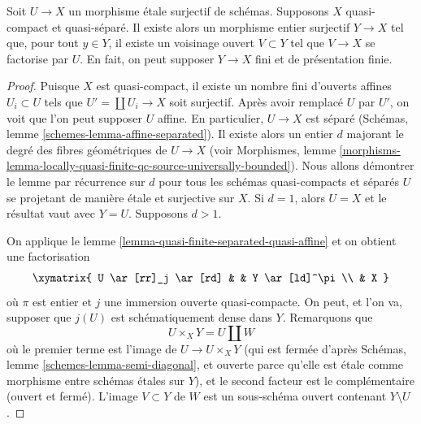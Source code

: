 \begin{lemma}
\label{lemma-there-is-a-scheme-integral-over}
Soit $U \to X$ un morphisme \'etale surjectif de schémas. Supposons $X$
quasi-compact et quasi-séparé. Il existe alors un morphisme entier surjectif
$Y \to X$ tel que, pour
tout $y \in Y$, il existe un voisinage ouvert $V \subset Y$
tel que $V \to X$ se factorise par $U$. En fait, on peut supposer
$Y \to X$ fini et de présentation finie.
\end{lemma}

\begin{proof}
Puisque $X$ est quasi-compact, il existe un nombre fini d'ouverts affines
$U_i \subset U$ tels que $U' = \coprod U_i \to X$ soit surjectif.
Après avoir remplacé $U$ par $U'$, on voit que l'on peut supposer $U$ affine.
En particulier, $U \to X$ est séparé
(Schémas, lemme \ref{schemes-lemma-affine-separated}).
Il existe alors un entier $d$ majorant le degré des fibres géométriques
de $U \to X$ (voir Morphismes, lemme
\ref{morphisms-lemma-locally-quasi-finite-qc-source-universally-bounded}).
Nous allons démontrer le lemme par récurrence sur $d$ pour tous les schémas
quasi-compacts et séparés $U$ se projetant de manière \'etale et surjective sur $X$.
Si $d = 1$, alors $U = X$ et le résultat vaut avec $Y = U$.
Supposons $d > 1$.

\medskip\noindent
On applique le lemme \ref{lemma-quasi-finite-separated-quasi-affine}
et on obtient une factorisation
$$
\xymatrix{
U \ar[rr]_j \ar[rd] & & Y \ar[ld]^\pi \\
& X
}
$$
où $\pi$ est entier et $j$ une immersion ouverte quasi-compacte. On peut, et l'on va,
supposer que $j(U)$ est schématiquement dense dans $Y$. Remarquons que
$$
U \times_X Y = U \amalg W
$$
où le premier terme est l'image de $U \to U \times_X Y$
(qui est fermée d'après
Schémas, lemme \ref{schemes-lemma-semi-diagonal},
et ouverte parce qu'elle est \'etale comme morphisme entre schémas \'etales sur $Y$),
et le second facteur est le complémentaire (ouvert et fermé).
L'image $V \subset Y$ de $W$ est un sous-schéma ouvert contenant
$Y \setminus U$.


\end{proof}
